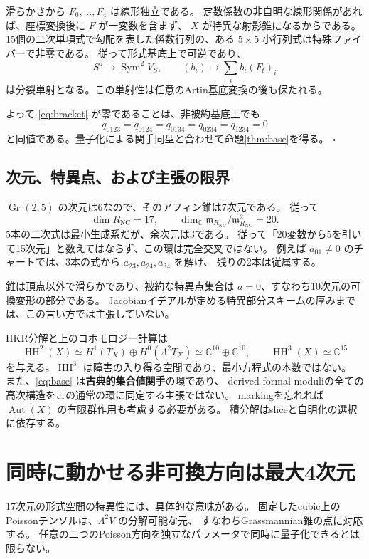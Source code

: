 \documentclass[a4paper,11pt]{ltjsarticle}
\theoremstyle{definition}
\newcommand{\CC}{\mathbb C}
\newcommand{\HH}{\operatorname{HH}}
\newcommand{\Gr}{\operatorname{Gr}}
\newcommand{\Sym}{\operatorname{Sym}}
\newcommand{\NC}{\operatorname{NC}}
\newcommand{\frakm}{\mathfrak m}
\begin{document}
滑らかさから $F_0,\ldots,F_4$ は線形独立である。
定数係数の非自明な線形関係があれば、座標変換後に $F$ が一変数を含まず、
$X$ が特異な射影錐になるからである。
15個の二次単項式で勾配を表した係数行列の、ある $5\times5$ 小行列式は特殊ファイバーで非零である。
従って形式基底上で可逆であり、
\[
 S^5\longrightarrow\Sym^2V_S,\qquad (b_i)\longmapsto\sum_i b_i(F_t)_i
\]
は分裂単射となる。この単射性は任意のArtin基底変換の後も保たれる。

よって \eqref{eq:bracket} が零であることは、非被約基底上でも
\[
 q_{0123}=q_{0124}=q_{0134}=q_{0234}=q_{1234}=0
\]
と同値である。量子化による関手同型と合わせて命題\ref{thm:base}を得る。
\hfill$\square$

\subsection{次元、特異点、および主張の限界}

$\Gr(2,5)$ の次元は6なので、そのアフィン錐は7次元である。
従って
\[
 \dim R_{\NC}=17,\qquad
 \dim_\CC\frakm_{R_{\NC}}/\frakm_{R_{\NC}}^2=20.
\]
5本の二次式は最小生成系だが、余次元は3である。
従って「20変数から5を引いて15次元」と数えてはならず、この環は完全交叉ではない。
例えば $a_{01}\ne0$ のチャートでは、3本の式から $a_{23},a_{24},a_{34}$ を解け、
残りの2本は従属する。

錐は頂点以外で滑らかであり、被約な特異点集合は $a=0$、すなわち10次元の可換変形の部分である。
Jacobianイデアルが定める特異部分スキームの厚みまでは、この言い方では主張していない。

HKR分解と上のコホモロジー計算は
\[
 \HH^2(X)\simeq H^1(T_X)\oplus H^0(\Lambda^2T_X)\simeq\CC^{10}\oplus\CC^{10},
 \qquad \HH^3(X)\simeq\CC^{15}
\]
を与える\cite{May}。$\HH^3$ は障害の入り得る空間であり、最小方程式の本数ではない。
また、\eqref{eq:base} は\textbf{古典的集合値関手}の環であり、
derived formal moduliの全ての高次構造をこの通常の環に同定する主張ではない。
markingを忘れれば $\operatorname{Aut}(X)$ の有限群作用も考慮する必要がある。
積分解はsliceと自明化の選択に依存する。

\section{同時に動かせる非可換方向は最大4次元}

17次元の形式空間の特異性には、具体的な意味がある。
固定したcubic上のPoissonテンソルは、$\Lambda^2V$ の分解可能な元、
すなわちGrassmannian錐の点に対応する\cite[Theorem 1]{May}。
任意の二つのPoisson方向を独立なパラメータで同時に量子化できるとは限らない。
\end{document}
